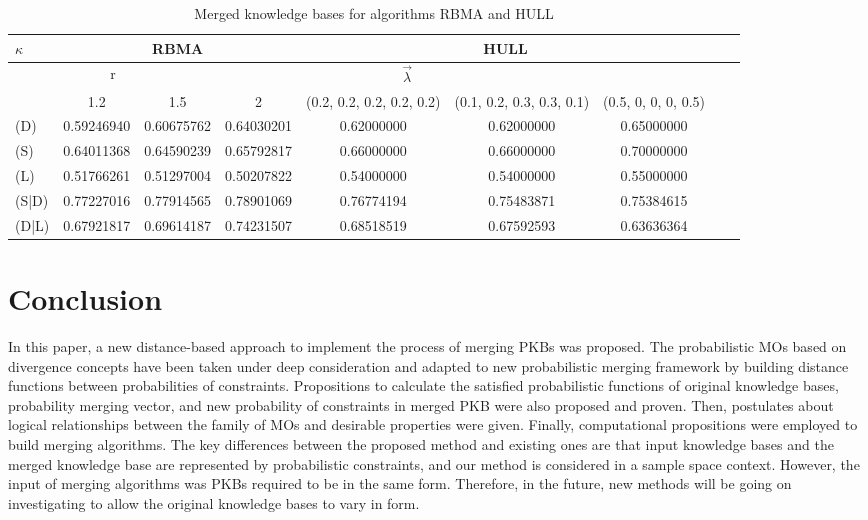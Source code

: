 \documentclass[]{iosart2c}
\begin{document}
  \begin{table*}[htb]
    \caption{Merged knowledge bases for algorithms RBMA and HULL}
    \begin{tabular}{|l|c|c|c|c|c|c|c|c|}
      \hline
      {$\kappa$} & \multicolumn{3}{|c|}{RBMA} & \multicolumn{3}{|c|}{HULL} \\
      \hline
      \multicolumn{3}{|c|}{r} & \multicolumn{3}{|c|}{$\vec{\lambda}$} \\
      \hline
      & 1.2        & 1.5        & 2          & (0.2, 0.2, 0.2, 0.2, 0.2) & (0.1, 0.2, 0.3, 0.3, 0.1) & (0.5, 0, 0, 0, 0.5) \\
      \hline
      (D)   & 0.59246940 & 0.60675762 & 0.64030201 & 0.62000000                & 0.62000000                & 0.65000000\\
      (S)   & 0.64011368 & 0.64590239 & 0.65792817 & 0.66000000                & 0.66000000                & 0.70000000\\
      (L)   & 0.51766261 & 0.51297004 & 0.50207822 & 0.54000000                & 0.54000000                & 0.55000000\\
      (S|D) & 0.77227016 & 0.77914565 & 0.78901069 & 0.76774194                & 0.75483871                & 0.75384615\\
      (D|L) & 0.67921817 & 0.69614187 & 0.74231507 & 0.68518519                & 0.67592593                & 0.63636364          \\
    \end{tabular}
  \end{table*}


  \section{Conclusion}

  In this paper, a new distance-based approach to implement the process of merging PKBs was proposed. The probabilistic MOs based on divergence concepts have been taken under deep consideration and adapted to new probabilistic merging framework by building distance functions between probabilities of constraints. Propositions to calculate the satisfied probabilistic functions of original knowledge bases, probability merging vector, and new probability of constraints in merged PKB were also proposed and proven. Then, postulates about logical relationships between the family of MOs and desirable properties were given. Finally, computational propositions were employed to build merging algorithms. The key differences between the proposed method and existing ones are that input knowledge bases and the merged knowledge base are represented by probabilistic constraints, and our method is considered in a sample space context. However, the input of merging algorithms was PKBs required to be in the same form. Therefore, in the future, new methods will be going on investigating to allow the original knowledge bases to vary in form.
\end{document}
